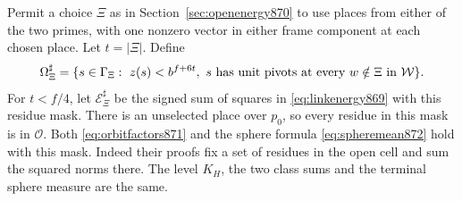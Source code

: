 \documentclass[a4paper,11pt]{article}
\theoremstyle{definition}
\theoremstyle{remark}
\numberwithin{equation}{section}
\begin{document}
Permit a choice \(\Xi\) as in Section~\ref{sec:openenergy870}
to use places from either of the two primes, with one nonzero
vector in either frame component at each chosen place. Let
\(t=|\Xi|\). Define
\[
 \Omega_\Xi^\sharp
 =\{s\in\Gamma_\Xi:\ z(s)< b^{f+6t},\
              s\ \hbox{has unit pivots at every } w\notin\Xi
                   \hbox{ in }\mathcal W\}.
\]
For \(t<f/4\), let \(\mathcal E_\Xi^\sharp\) be the signed sum of
squares in \eqref{eq:linkenergy869} with this residue mask.
There is an unselected place over \(p_0\), so every residue in
this mask is in \(\mathcal O\). Both \eqref{eq:orbitfactors871}
and the sphere formula \eqref{eq:spheremean872} hold with this
mask. Indeed their proofs fix a set of residues in the open
cell and sum the squared norms there. The level \(K_H\), the
two class sums and the terminal sphere measure are the same.
\end{document}
